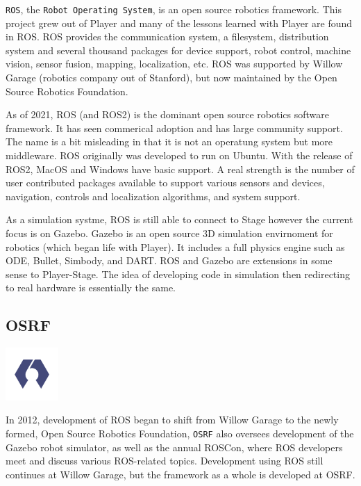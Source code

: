 \texttt{ROS}, the \texttt{Robot\ Operating\ System}, is an open source
robotics framework. This project grew out of Player and many of the
lessons learned with Player are found in ROS. ROS provides the
communication system, a filesystem, distribution system and several
thousand packages for device support, robot control, machine vision,
sensor fusion, mapping, localization, etc. ROS was supported by Willow
Garage (robotics company out of Stanford), but now maintained by the
Open Source Robotics Foundation.

As of 2021, ROS (and ROS2) is the dominant open source robotics software
framework. It has seen commerical adoption and has large community
support. The name is a bit misleading in that it is not an operatung
system but more middleware. ROS originally was developed to run on
Ubuntu. With the release of ROS2, MacOS and Windows have basic support.
A real strength is the number of user contributed packages available to
support various sensors and devices, navigation, controls and
localization algorithms, and system support.

As a simulation systme, ROS is still able to connect to Stage however
the current focus is on Gazebo. Gazebo is an open source 3D simulation
envirnoment for robotics (which began life with Player). It includes a
full physics engine such as ODE, Bullet, Simbody, and DART. ROS and
Gazebo are extensions in some sense to Player-Stage. The idea of
developing code in simulation then redirecting to real hardware is
essentially the same.

\hypertarget{osrf}{%
\subsection{OSRF}\label{osrf}}

\includegraphics[width=0.15\textwidth,height=\textheight]{ToolsFigures/osrf_masthead.png}

In 2012, development of ROS began to shift from Willow Garage to the
newly formed, Open Source Robotics Foundation, \texttt{OSRF} also
oversees development of the Gazebo robot simulator, as well as the
annual ROSCon, where ROS developers meet and discuss various ROS-related
topics. Development using ROS still continues at Willow Garage, but the
framework as a whole is developed at OSRF.


